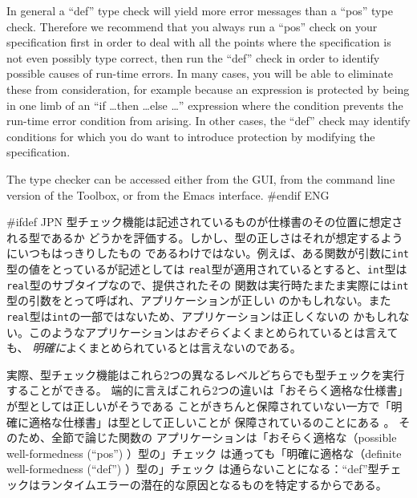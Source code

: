 \documentclass[\pformat,12pt]{article}
\newcommand{\Toolbox}{Toolbox}
\newcommand{\Toolbox}{Toolbox}
\newcommand{\aaa}{\tt }
\begin{document}
In general a ``def'' type check will yield more error messages than
a ``pos'' type check. Therefore we recommend that you always run a ``pos''
check on your specification first in order to deal with all the points
where the specification is not even possibly type correct, then run the ``def''
check in order to identify possible causes of run-time errors. In many
cases, you will be able to eliminate these from consideration, for
example because an expression is protected by being in one limb of an
``if \ldots then \ldots else \ldots'' expression where the condition
prevents the run-time error condition from arising. In other cases,
the ``def'' check may identify conditions for which you do want to
introduce protection  by modifying the specification.

The type checker can be accessed either from the GUI, from the command
line version of the \Toolbox, or from the Emacs interface.
#endif ENG
  
#ifdef JPN
型チェック機能は記述されているものが仕様書のその位置に想定される型であるか
どうかを評価する。しかし、型の正しさはそれが想定するようにいつもはっきりしたもの
であるわけではない。例えば、ある関数が引数に{\aaa int}型の値をとっているが記述としては
{\aaa real}型が適用されているとすると、{\aaa int}型は{\aaa real}型のサブタイプなので、提供されたその
関数は実行時たまたま実際には{\aaa int}型の引数をとって呼ばれ、アプリケーションが正しい
のかもしれない。また{\aaa real}型は{\aaa int}の一部ではないため、アプリケーションは正しくないの
かもしれない。このようなアプリケーションは{\em おそらく\/}よくまとめられているとは言えても、
{\em 明確に\/}よくまとめられているとは言えないのである。

実際、型チェック機能はこれら2つの異なるレベルどちらでも型チェックを実行することができる。
端的に言えばこれら2つの違いは「おそらく適格な仕様書」が型としては正しいがそうである
ことがきちんと保障されていない一方で「明確に適格な仕様書」は型として正しいことが
保障されているのことにある
。
そのため、全節で論じた関数の
アプリケーションは「おそらく適格な（possible well-formedness (``pos'') ）型の」チェック 
は通っても「明確に適格な（definite well-formedness (``def'') ）型の」チェック 
は通らないことになる：``def''型チェックはランタイムエラーの潜在的な原因となるものを特定するからである。
\end{document}

